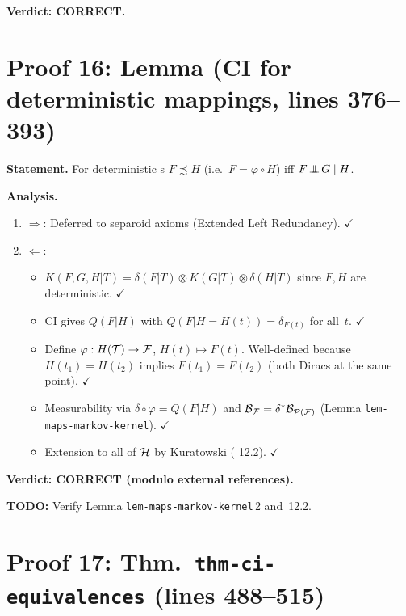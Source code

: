 \documentclass{article}
\begin{document}
\textbf{Verdict: CORRECT.}

\section{Proof 16: Lemma (CI for deterministic mappings, lines 376--393)}

\textbf{Statement.}  For deterministic \trv{}s $F\precsim H$
(i.e.\ $F=\varphi\circ H$) iff $F\operatorname*{\perp\mkern-11mu\perp} G\mid H$.

\textbf{Analysis.}
\begin{enumerate}[leftmargin=*]
  \item $\Rightarrow$: Deferred to separoid axioms (Extended Left Redundancy).  $\checkmark$
  \item $\Leftarrow$:
    \begin{itemize}
      \item $K(F,G,H|T)=\delta(F|T)\otimes K(G|T)\otimes\delta(H|T)$ since $F,H$
            are deterministic.  $\checkmark$
      \item CI gives $Q(F|H)$ with $Q(F|H=H(t))=\delta_{F(t)}$ for all~$t$.  $\checkmark$
      \item Define $\varphi:H(\mathcal{T})\to\mathcal{F}$, $H(t)\mapsto F(t)$.
            Well-defined because $H(t_1)=H(t_2)$ implies $F(t_1)=F(t_2)$
            (both Diracs at the same point).  $\checkmark$
      \item Measurability via $\delta\circ\varphi=Q(F|H)$ and
            $\mathcal{B}_{\mathcal{F}}=\delta^*\mathcal{B}_{\mathcal{P}(\mathcal{F})}$
            (Lemma \texttt{lem-maps-markov-kernel}).  $\checkmark$
      \item Extension to all of $\mathcal{H}$ by Kuratowski (\cite{Kec95} 12.2).  $\checkmark$
    \end{itemize}
\end{enumerate}

\textbf{Verdict: CORRECT (modulo external references).}

\textbf{TODO:} Verify Lemma \texttt{lem-maps-markov-kernel}\,2 and \cite{Kec95}\,12.2.

\section{Proof 17: Thm.\ \texttt{thm-ci-equivalences} (lines 488--515)}
\end{document}

